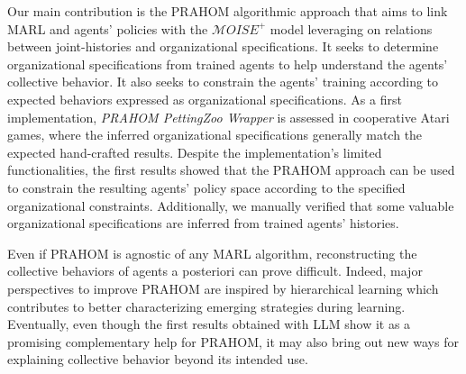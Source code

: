 \documentclass[doubleblind]{ecai}
\newcounter{relation}
\newcounter{proof}
\begin{document}

Our main contribution is the PRAHOM algorithmic approach that aims to link MARL and agents' policies with the $\mathcal{M}OISE^+$ model leveraging on relations between joint-histories and organizational specifications. It seeks to determine organizational specifications from trained agents to help understand the agents' collective behavior. It also seeks to constrain the agents' training according to expected behaviors expressed as organizational specifications.
As a first implementation, \emph{PRAHOM PettingZoo Wrapper} is assessed in cooperative Atari games, where the inferred organizational specifications generally match the expected hand-crafted results.
Despite the implementation's limited functionalities, the first results showed that the PRAHOM approach can be used to constrain the resulting agents' policy space according to the specified organizational constraints. Additionally, we manually verified that some valuable organizational specifications are inferred from trained agents' histories.

Even if PRAHOM is agnostic of any MARL algorithm, reconstructing the collective behaviors of agents a posteriori can prove difficult. Indeed, major perspectives to improve PRAHOM are inspired by hierarchical learning which contributes to better characterizing emerging strategies during learning.
Eventually, even though the first results obtained with LLM show it as a promising complementary help for PRAHOM, it may also bring out new ways for explaining collective behavior beyond its intended use.






\newpage






% 
\end{document}
